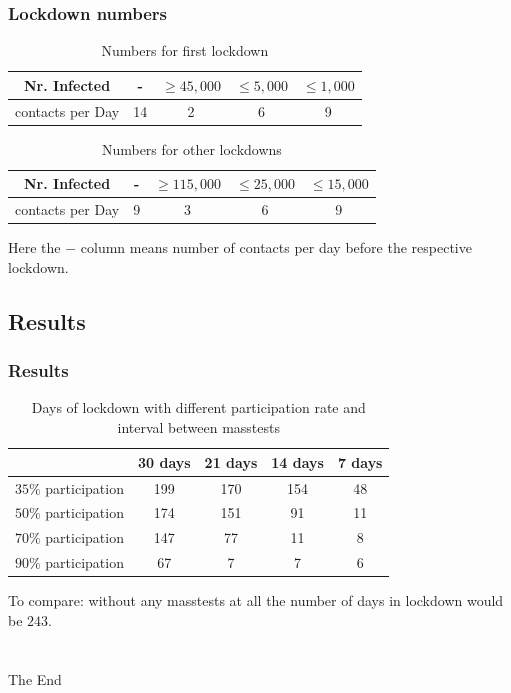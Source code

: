 \documentclass{beamer}
\begin{document}
\begin{frame}
  \frametitle{Lockdown numbers}

  \begin{table}[!h]
  \begin{center}
  \begin{tabular}{|c||c|c|c|c|}
  \hline
    Nr. Infected &- & $\geq 45,000$ & $\leq 5,000$ & $\leq 1,000$ \\
    \hline
    contacts per Day & 14 & 2 & 6 & 9 \\
    \hline
  \end{tabular}
  \end{center}
  \caption{Numbers for first lockdown}
  \end{table}

  \begin{table}[!h]
  \begin{center}
  \begin{tabular}{|c||c|c|c|c|}
  \hline
    Nr. Infected &- & $\geq 115,000$ & $\leq 25,000$ & $\leq 15,000$ \\
    \hline
    contacts per Day & 9 & 3 & 6 & 9 \\
    \hline
  \end{tabular}
  \end{center}
  \caption{Numbers for other lockdowns}
  \end{table}

  Here the $-$ column means number of contacts per day before the respective lockdown.
\end{frame}

\subsection{Results}

\begin{frame}
\frametitle{Results}

\begin{table}[!h]
{\small%
\begin{center}
\begin{tabular}{|c||c|c|c|c|}
 \hline
 & 30 days    & 21 days   & 14 days  & 7 days  \\
  \hline
  \hline
      $35\%$ participation    & 199 &  170&  154  & 48   \\
  \hline
      $50\%$ participation & 174 & 151 & 91 & 11 \\
  \hline
      $70\%$ participation & 147 &  77 & 11 & 8 \\
  \hline
      $90\%$ participation & 67 &7 &7  & 6\\
      \hline
\end{tabular}
\end{center}
}%

\caption{Days of lockdown with different participation rate and interval between masstests}
\end{table}
To compare: without any masstests at all the number of days in lockdown would be $243$.
\end{frame}
\section{}
\begin{frame}
\Huge{\centerline{The End}}
\end{frame}

\end{document}
